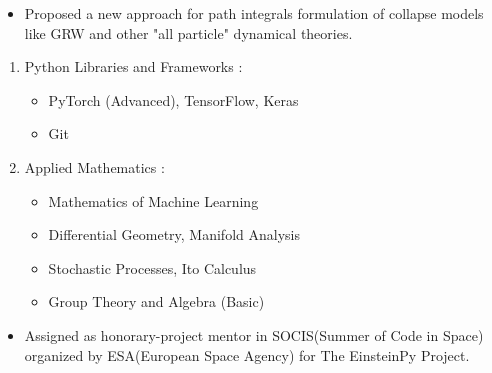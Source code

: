 \documentclass[10pt,a4paper,ragged2e]{altacv}
\begin{document}
\divider

\begin{itemize}
\item Proposed a new approach for path integrals formulation of collapse models like GRW and other "all particle" dynamical theories.
\end{itemize}





\begin{enumerate}
\item Python Libraries and Frameworks :
  \begin{itemize}
    \item PyTorch (Advanced), TensorFlow, Keras
  \end{itemize}
  \begin{itemize}
    \item Git
  \end{itemize}
\item Applied Mathematics :
  \begin{itemize}
    \item Mathematics of Machine Learning
  \end{itemize}
  \begin{itemize}
    \item Differential Geometry, Manifold Analysis
  \end{itemize}
  \begin{itemize}
    \item Stochastic Processes, Ito Calculus
  \end{itemize}
  \begin{itemize}
    \item Group Theory and Algebra (Basic)
  \end{itemize}
\end{enumerate}






\begin{itemize}
\item Assigned as honorary-project mentor in SOCIS(Summer of Code in Space) organized by ESA(European Space Agency) for The EinsteinPy Project.
\end{itemize}
\end{document}
